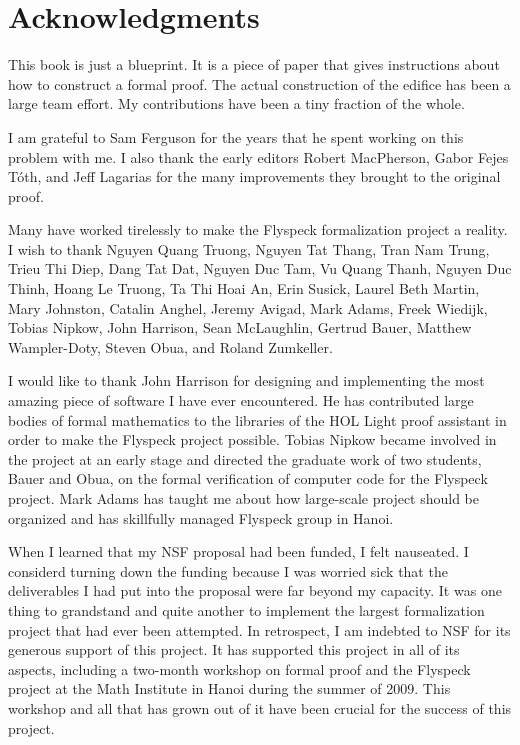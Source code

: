 

\section*{Acknowledgments}

This book is just a blueprint.  It is a piece of paper that gives instructions
about how to construct a formal proof.  The actual construction of the edifice
has been a large team effort.  My contributions have been a tiny fraction of the whole.

I am grateful to Sam Ferguson for the years that
he spent working on this problem with me.  I also thank the early editors
Robert MacPherson, Gabor Fejes T\'oth, and Jeff Lagarias for the many improvements
they brought to the original proof.

Many have worked tirelessly to make the Flyspeck formalization project
a reality.  I wish to thank Nguyen Quang
Truong, %
Nguyen Tat Thang, %
Tran Nam Trung, Trieu Thi Diep, Dang Tat Dat, Nguyen Duc Tam, Vu Quang
Thanh, Nguyen Duc Thinh, Hoang Le Truong, Ta Thi Hoai An, Erin Susick,
Laurel Beth Martin, Mary Johnston, Catalin Anghel, Jeremy Avigad,
Mark Adams, Freek Wiedijk, Tobias Nipkow, John Harrison, Sean
McLaughlin, Gertrud Bauer, Matthew Wampler-Doty, Steven Obua, and
Roland Zumkeller.

 I would like to thank John Harrison for designing and implementing the most amazing piece of
 software I have ever encountered.  He has contributed large bodies of formal mathematics to
the libraries of the HOL Light proof assistant in order to make the Flyspeck project
possible.   Tobias Nipkow became involved in the project at an early stage and
directed the graduate work of two students, Bauer and Obua, on the formal verification of computer
code for the Flyspeck project. Mark Adams has taught me about how
 large-scale project should be organized and has skillfully managed 
  Flyspeck group in Hanoi.

  When I learned that my NSF proposal had been funded, I felt
  nauseated.  I considerd turning down the
  funding because I was  worried sick that the  deliverables I had put
  into the proposal were far beyond my capacity.  It was one thing to
  grandstand and quite another to implement the largest
  formalization project that had ever been attempted.  In retrospect, I
  am indebted to NSF for its generous support of this project.  It has supported
  this project in all of its aspects, including a
  two-month  workshop on formal proof
  and the Flyspeck project  at the Math Institute in Hanoi during the summer of
  2009.  This workshop and all that has grown out of it have been crucial for
  the success of this project.

